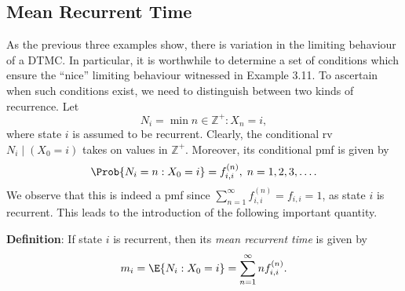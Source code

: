 \subsection*{Mean Recurrent Time}
As the previous three examples show, there is variation in the limiting behaviour of a DTMC\@.
In particular, it is worthwhile to determine a set of conditions which ensure the ``nice'' limiting
behaviour witnessed in Example 3.11. To ascertain when such conditions exist, we need to
distinguish between two kinds of recurrence. Let
\[ N_i=\min{n\in\mathbb{Z}^+:X_n=i}, \]
where state $ i $ is assumed to be recurrent. Clearly, the conditional rv $ N_i\mid(X_0=i) $ takes
on values in $ \mathbb{Z}^+ $. Moreover, its conditional pmf is given by
\[ \Prob{N_i=n\given X_0=i}=f_{i,i}^{(n)},\;n=1,2,3,\ldots. \]
We observe that this is indeed a pmf since $ \sum_{n=1}^{\infty} f_{i,i}^{(n)}=f_{i,i}=1 $,
as state $ i $ is recurrent. This
leads to the introduction of the following important quantity.
\begin{Regular}
    \textbf{Definition}: If state $ i $ is recurrent, then its \emph{mean recurrent time} is given by
    \[ m_i=\E{N_i\given X_0=i}=\sum_{n=1}^{\infty} n f_{i,i}^{(n)}. \]
\end{Regular}
